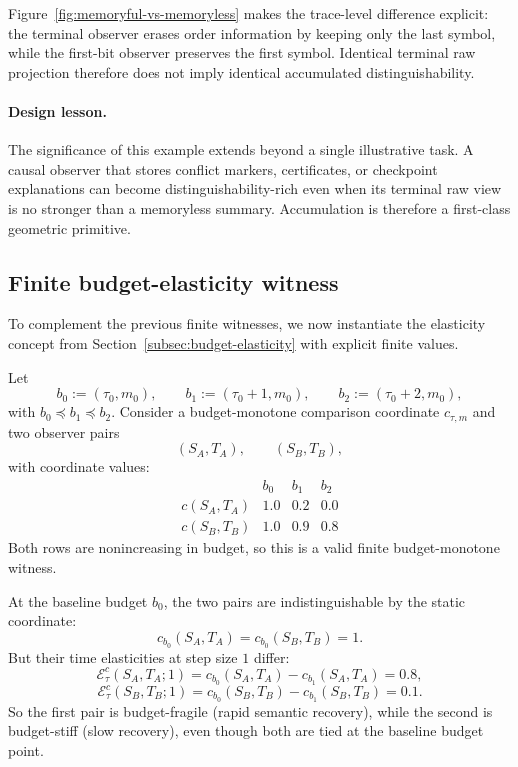 \documentclass[11pt,twoside]{article}
\theoremstyle{definition}
\begin{document}
Figure~\ref{fig:memoryful-vs-memoryless} makes the trace-level difference explicit: the terminal observer erases order information by keeping only the last symbol, while the first-bit observer preserves the first symbol. Identical terminal raw projection therefore does not imply identical accumulated distinguishability.

\paragraph{Design lesson.}
The significance of this example extends beyond a single illustrative task. A causal observer that stores conflict markers, certificates, or checkpoint explanations can become distinguishability-rich even when its terminal raw view is no stronger than a memoryless summary. Accumulation is therefore a first-class geometric primitive.

\subsection{Finite budget-elasticity witness}
\label{subsec:finite-elasticity-witness}

To complement the previous finite witnesses, we now instantiate the elasticity concept from Section~\ref{subsec:budget-elasticity} with explicit finite values.

Let
\[
  b_0:=(\tau_0,m_0),\qquad
  b_1:=(\tau_0+1,m_0),\qquad
  b_2:=(\tau_0+2,m_0),
\]
with \(b_0\preceq b_1\preceq b_2\). Consider a budget-monotone comparison coordinate \(c_{\tau,m}\) and two observer pairs
\[
  (S_A,T_A),\qquad (S_B,T_B),
\]
with coordinate values:
\[
\begin{array}{c|ccc}
 & b_0 & b_1 & b_2\\\hline
 c(S_A,T_A) & 1.0 & 0.2 & 0.0\\
 c(S_B,T_B) & 1.0 & 0.9 & 0.8
\end{array}
\]
Both rows are nonincreasing in budget, so this is a valid finite budget-monotone witness.

At the baseline budget \(b_0\), the two pairs are indistinguishable by the static coordinate:
\[
  c_{b_0}(S_A,T_A)=c_{b_0}(S_B,T_B)=1.
\]
But their time elasticities at step size \(1\) differ:
\[
  \mathcal{E}^{c}_{\tau}(S_A,T_A;1)
  =
  c_{b_0}(S_A,T_A)-c_{b_1}(S_A,T_A)
  =
  0.8,
\]
\[
  \mathcal{E}^{c}_{\tau}(S_B,T_B;1)
  =
  c_{b_0}(S_B,T_B)-c_{b_1}(S_B,T_B)
  =
  0.1.
\]
So the first pair is budget-fragile (rapid semantic recovery), while the second is budget-stiff (slow recovery), even though both are tied at the baseline budget point.
\end{document}
